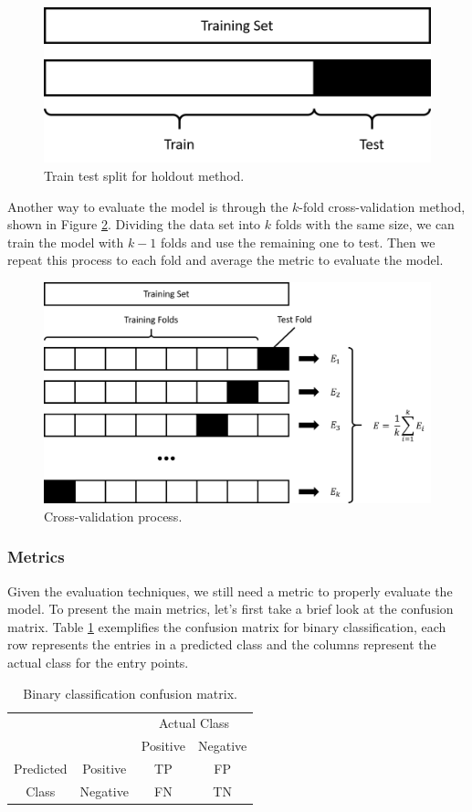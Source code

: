 	\begin{figure}[h!]
		\centering
		\includegraphics[width=0.5\linewidth]{01.Chapters/02.Background/holdout-evaluate}
		\caption{Train test split for holdout method.}
		\label{fig:holdout-evaluate}
	\end{figure}

	Another way to evaluate the model is through the $k$-fold cross-validation method, shown in Figure \ref{fig:cross-validate}. Dividing the data set into $k$ folds with the same size, we can train the model with $k-1$ folds and use the remaining one to test. Then we repeat this process to each fold and average the metric to evaluate the model.

	\begin{figure}[h!]
		\centering
		\includegraphics[width=0.6\linewidth]{01.Chapters/02.Background/cross-validate}
		\caption{Cross-validation process.}
		\label{fig:cross-validate}
	\end{figure}
	
	\subsubsection{Metrics}
	\label{sub-sub:metrics}

	Given the evaluation techniques, we still need a metric to properly evaluate the model. To present the main metrics, let's first take a brief look at the confusion matrix. Table \ref{tab:conf-matrix} exemplifies the confusion matrix for binary classification, each row represents the entries in a predicted class and the columns represent the actual class for the entry points.
	
	\begin{table}[h!]
		\centering
		\caption{Binary classification confusion matrix.}
		\label{tab:conf-matrix}		
		\begin{tabular}{cc|c|c|}
			\cline{3-4}
			&          & \multicolumn{2}{c|}{Actual Class} \\ \cline{3-4} 
			&          & Positive        & Negative        \\ \hline
			\multicolumn{1}{|c|}{Predicted} & Positive & TP              & FP              \\ \cline{2-4} 
			\multicolumn{1}{|c|}{Class}     & Negative & FN              & TN              \\ \hline
		\end{tabular}
	\end{table}

